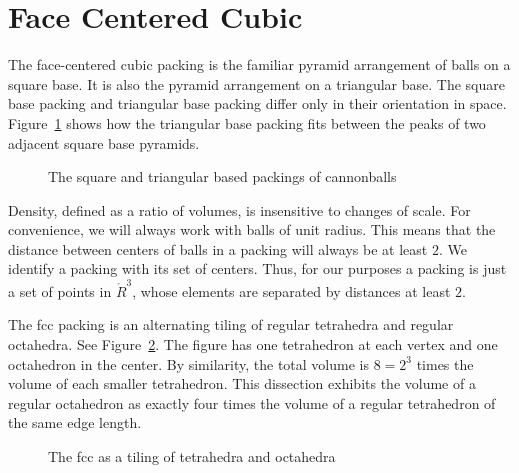 


\clearpage
\section{Face Centered Cubic}



The face-centered cubic packing is the familiar pyramid arrangement
of balls on a square base.  It is also the pyramid arrangement on 
a triangular base.  The square base packing and triangular base
packing differ only in their orientation in space.  
Figure~\ref{fig:tri-square-cannonballs} 
shows how the triangular base packing fits between the peaks
of two adjacent square base pyramids.

\begin{figure}[htb]
  \centering
  \caption{The square and triangular based packings of cannonballs}
  \label{fig:tri-square-cannonballs}
\end{figure}

Density, defined as a ratio of volumes, is insensitive to changes
of scale.  For convenience, we will always work with balls of unit radius.
This means that the distance between centers of balls in a packing
will always be at least $2$.  We identify a packing with
its set of centers.  Thus, for our purposes a packing is just
a set of points in $\ring{R}^3$, whose elements are separated by
distances at least $2$.


The fcc packing is an alternating tiling of regular
tetrahedra and regular octahedra.  See Figure~\ref{fig:tet-oct}.
The figure has one
tetrahedron at each vertex and one octahedron in the center.
By similarity, the total volume is $8 = 2^3$ times the volume of each
smaller tetrahedron.
This dissection exhibits
the volume of a regular octahedron as exactly four times
the volume of a regular tetrahedron of the same edge length.

\begin{figure}[htb]
  \centering
  \caption{The fcc as a tiling of tetrahedra and octahedra}
  \label{fig:tet-oct}
\end{figure}









